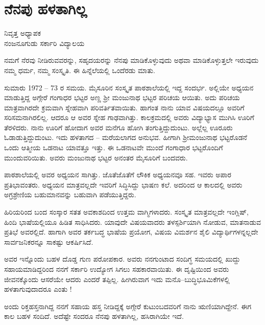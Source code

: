\chapter{ನೆನಪು ಹಳತಾಗಿಲ್ಲ}

\begin{center}
\smallskip

ನಿವೃತ್ತ ಅಧ್ಯಾಪಕ\\
ನಂಜನೂಗುಡು ಸರ್ಕಾರಿ ವಿದ್ಯಾಲಯ
\addrule
\end{center}

ನಮಗೆ ನೆರವು ನೀಡಿರುವವರನ್ನು, ಸಹೃದಯರನ್ನು ನೆನಪು ಮಾಡಿಕೊಳ್ಳುವುದು ಅಥವಾ ಮಾಡಿಕೊಳ್ಳುತ್ತಲೇ ಇರುವುದು ನಮ್ಮ ಧರ್ಮ, ನಮ್ಮ ಸಂಸ್ಕೃತಿ. ಈ ಹಿನ್ನೆಲೆಯಲ್ಲಿ ಒಂದೆರಡು ಮಾತು.

ಸುಮಾರು 1972 – 73 ರ ಸಮಯ. ಮೈಸೂರಿನ ಸಂಸ್ಕೃತ ಪಾಠಶಾಲೆಯಲ್ಲಿ ಇದ್ದ ಸಂದರ್ಭ. ಅಲ್ಲಿಯೇ ಅಧ್ಯಯನ ಮಾಡುತ್ತಿದ್ದ ಅಗ್ಗೇರೆ ಗಂಗಾಧರ ಭಟ್ಟರ ಅಣ್ಣ ಶ್ರೀ ಮಂಜುನಾಥ ಭಟ್ಟರ ಪರಿಚಯ ಆಯಿತು. ಅದು ಪರಿಚಯ ಮಾತ್ರವಾಗಿರದೇ ಕ್ರಮವಾಗಿ ಸ್ನೇಹವಾಗಿ ಪರಿವರ್ತಿತವಾಯಿತು. ಹಾಗಂತ ನಾನು ಯಾವ ವಿಷಯದಲ್ಲೂ ಅವರಿಗೆ ಸರಿಸಮನಾಗಿರಲಿಲ್ಲ. ಆದರೂ ಆ ಅವರ ಸ್ನೇಹ ಗಾಢವಾಗಿತ್ತು. ಕಾಲಕ್ರಮದಲ್ಲಿ ಅವರು ವಿದ್ಯಾಭ್ಯಾಸ ಮುಗಿಸಿ ಊರಿಗೆ ತೆರಳಿದರು. ನಾನು ಊರಿಗೆ ಹೋದಾಗ ಅವರ ಮನೆಗೂ ಹೋಗಿ ತಂಗುತ್ತಿದ್ದುದುಂಟು. ಅಲ್ಲೆಲ್ಲ ಊರೂರು ಓಡಾಡುತ್ತಿದ್ದುದುಂಟು. ಇದು ಹಳತಾಗದ – ಮರೆಯಲಾಗದ ಅನುಭವ. ಹೀಗಾಗಿ ಶ್ರೀಮಂಜುನಾಥ ಭಟ್ಟರೊಡನೆ ಒಂದು ಆತ್ಮೀಯ ಒಡನಾಟ ಯಾವತ್ತೂ ಇತ್ತು. ಈ ಒಡನಾಟವೇ ಮುಂದೆ ಗಂಗಾಧಾರ ಭಟ್ಟರೊಂದಿಗೆ ಮುಂದುವರಿಯಿತು. ಅವರು ಮಂಜುನಾಥ ಭಟ್ಟರ ಅನಂತರ ಮೈಸೂರಿಗೆ ಬಂದವರು.

ಪಾಠಶಾಲೆಯಲ್ಲಿ ಅವರ ಅಧ್ಯಯನ ಸಾಗಿತ್ತು. ಜೊತೆಜೊತೆಗೆ ಲೌಕಿಕ ಅಧ್ಯಯನವೂ ಸಹ. ಇವರು ಅಪಾರ ಪ್ರತಿಭಾವಂತರು. ಅಧ್ಯಯನ ಮಾತ್ರವಲ್ಲದೇ ಇವರಿಗೆ ಸಿದ್ಧಿಸಿದ್ದು ಭಾಷಣ ಕಲೆ. ಅದರಿಂದ ಆ ಕಾಲದಲ್ಲಿ ಅವರು ಅಗ್ರಶ್ರೇಣಿಯ ಬಹುಮಾನವನ್ನು ಬಹುವಾಗಿ ಪಡೆಯುತ್ತಿದ್ದರು. 

ಹಿರಿಯರಿಂದ ಬಂದ ಸಂಸ್ಕಾರ ಸತತ ಅವಕಾಶದಿಂದ ಉತ್ತಮ ವಾಗ್ಮಿಗಳಾದರು. ಸಂಸ್ಕೃತ ಮಾತ್ರವಲ್ಲದೇ ಇಂಗ್ಲಿಷ್, ಹಿಂದಿ ಭಾಷೆಯಲ್ಲಿಯೂ ಹಿಡಿತ ಸಾಧಿಸಿದರು. ಯಾವುದೇ ವಿಷಯವಾದರು ತಳಸ್ಪರ್ಶಿಯಾಗಿ ನೋಡುವ, ಮಾತನಾಡುವ ಪ್ರತಿಭೆ ಅವರಲ್ಲಿದೆ. ಹಾಗಾಗಿ ಅವರ ತರ್ಕಬದ್ಧ ಭಾಷೆಯ ಪ್ರಯೋಗ, ವಿಷಯ ವಿಮರ್ಶನ ಶೈಲಿ ವಿದ್ಯಾರ್ಥಿಗಳನ್ನಲ್ಲದೇ ಸಾರ್ವಜನಿಕರನ್ನೂ ಸಾಕಷ್ಟು ಆಕರ್ಷಿಸಿದೆ. 

ಅವರ ಇನ್ನೊಂದು ಬಹಳ ದೊಡ್ಡ ಗುಣ ಪರೋಪಕಾರ. ಅವರು ನನಗುಂಟಾದ ಸಂದಿಗ್ಧ ಸಮಯದಲ್ಲಿ  ಖುದ್ದು ಸಹಾಯಮಾಡಿದ್ದರಿಂದ ನನಗೆ ಸರ್ಕಾರಿ ಉದ್ಯೋಗ ಸಿಗಲು ಸಹಕಾರವಾಯಿತು. ಈ ದೃಷ್ಟಿಯಿಂದ ಅವರು ಜೀವನಕ್ಕೊಂದು ಆಸರೆಯೇ ಆದರು ಎಂದರೆ ತಪ್ಪಿಲ್ಲ. ಹೀಗಿರುವಾಗ ಇದು ಮನೊ–ಬುದ್ಧಿಭೂಮಿಕೆಗಳಲ್ಲಿ ಹಳತಾಗುವುದಾದರೂ ಎಂತು !

ಅಂದು ರಿಕ್ತಹಸ್ತನಾಗಿದ್ದ ನನಗೆ ಸಹಾಯ ಹಸ್ತ ನೀಡಿದ್ದಕ್ಕೆ ಅಗ್ಗೇರೆ ಕುಟುಂಬದವರಿಗೆ ನಾನು ಋಣಿಯಾಗಿದ್ದೇನೆ. ಈಗ ಕಾಲ ಬಹಳ ಸಂದಿದೆ.  ಅದೆಷ್ಟೇ ಸಂದರೂ ನೆನಪು ಹಳತಾಗಿಲ್ಲ, ಹಸಿರಾಗಿಯೇ ಇದೆ.

\articleend
